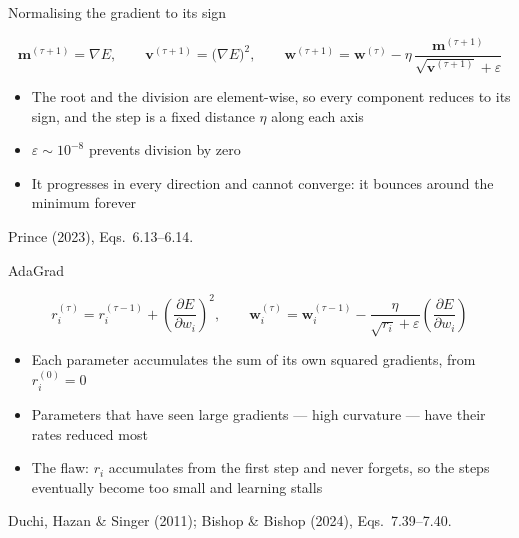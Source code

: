 \documentclass[aspectratio=169, 11pt]{beamer}
\newcommand{\srcline}[1]{%
  \par\vspace{0.25em}%
  {\scriptsize\color{mcMuted}\hfill #1\par}}
\newcommand{\src}[3]{}      %
\begin{document}
\begin{frame}{Normalising the gradient to its sign}
  \src{prince2023}{equation}{6.13-6.14}
  \src{prince2023}{section}{6.4}
  \vspace{-0.3em}
  \[
    \mathbf{m}^{(\tau+1)} = \nabla E ,
    \qquad
    \mathbf{v}^{(\tau+1)} = \big(\nabla E\big)^{2} ,
    \qquad
    \mathbf{w}^{(\tau+1)} = \mathbf{w}^{(\tau)}
      - \eta\,\frac{\mathbf{m}^{(\tau+1)}}{\sqrt{\mathbf{v}^{(\tau+1)}} + \varepsilon}
  \]
  \vspace{-0.6em}
  \begin{itemize}\itemsep0.3em
    \item The root and the division are \alert{element-wise}, so every
          component reduces to its sign, and the step is a fixed
          distance $\eta$ along each axis
    \item $\varepsilon \sim 10^{-8}$ prevents division by zero
    \item It progresses in every direction and \alert{cannot converge}:
          it bounces around the minimum forever
  \end{itemize}
  \srcline{Prince (2023), Eqs.~6.13--6.14.}
\end{frame}

\begin{frame}{AdaGrad}
  \src{bishop2024}{equation}{7.39-7.40}
  \src{bishop2024}{section}{7.3.3}
  \src{duchi2011}{equation}{1}
  \src{duchi2011}{section}{1.1}
  \vspace{-0.3em}
  \[
    r^{(\tau)}_i = r^{(\tau-1)}_i
      + \left(\frac{\partial E}{\partial w_i}\right)^{2} ,
    \qquad
    \mathbf{w}^{(\tau)}_i = \mathbf{w}^{(\tau-1)}_i
      - \frac{\eta}{\sqrt{r_i} + \varepsilon}
        \left(\frac{\partial E}{\partial w_i}\right)
  \]
  \vspace{-0.6em}
  \begin{itemize}\itemsep0.3em
    \item Each parameter accumulates the sum of its own squared
          gradients, from $r^{(0)}_i = 0$
    \item Parameters that have seen large gradients --- high curvature
          --- have their rates reduced most
    \item \alert{The flaw}: $r_i$ accumulates from the first step and
          never forgets, so the steps eventually become too small and
          learning stalls
  \end{itemize}
  \srcline{Duchi, Hazan \& Singer (2011); Bishop \& Bishop (2024),
  Eqs.~7.39--7.40.}
\end{frame}
\end{document}

